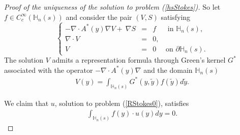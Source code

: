 \documentclass[11pt, reqno]{amsart}
\theoremstyle{definition}
\theoremstyle{remark}
\numberwithin{equation}{section}
\begin{document}
\begin{appendices}
\begin{proof}[Proof of the uniqueness of the solution to problem \textup{(\ref{hsStokes})}]
		\noindent So let $f\in C^\infty_c( \mathbb{H}_n(s)  )$ and consider the pair $(V,S)$ satisfying 
		\begin{equation}\label{RStokes_VR}
			\left\{
			\begin{array}{rcl}
				-\nabla\cdot A^* (y) \nabla V + \:  \nabla S&=& f \;\quad \mbox{ in } \mathbb{H}_n(s),\\
				\nabla\cdot V&=& 0  ,\\
				V	&=& 0  \quad \mbox{ on }  \partial \mathbb{H}_n(s).
			\end{array}
			\right. 
		\end{equation}
		The solution $V$ admits a representation formula through Green's kernel $G^*$ associated with the operator $	-\nabla\cdot A^* (y) \nabla$ and the domain $\mathbb{H}_n(s)$
		\begin{align}\label{repr_V}
			V(y)=\int_{ \mathbb{H}_n(s) } G^*(y,\tilde{y}) f(\tilde{y}) d\tilde{y}.
		\end{align}
		
		\noindent We claim that $u$, solution to problem (\ref{RStokes0}), satisfies 
		\begin{align}\label{target_result}
			\int_{ \mathbb{H}_n(s)  } f(y)\cdot u(y) dy = 0.
		\end{align}
		

\end{proof}
\end{appendices}
\end{document}
